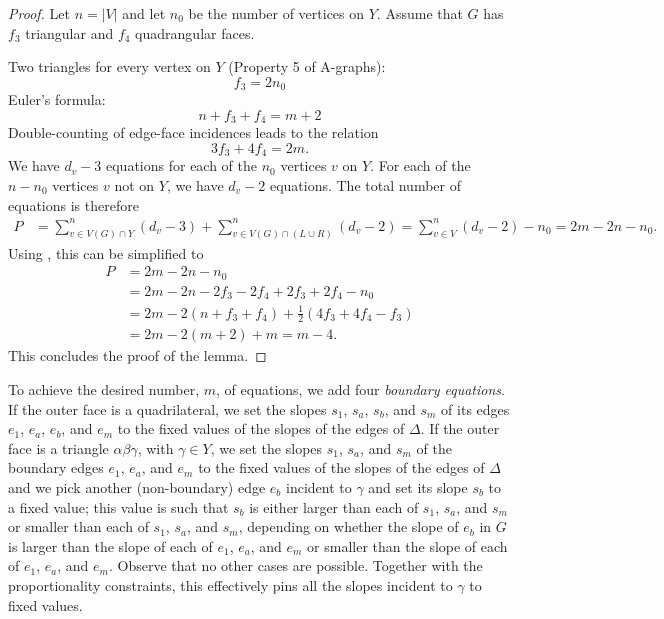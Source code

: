 \begin{proof}
Let $n=|V|$ and let $n_0$ be the number
of vertices on $Y$. Assume that $G$ has $f_3$ triangular and $f_4$
quadrangular faces.

Two triangles for every vertex on $Y$ (Property 5 of A-graphs):
\begin{equation}
\label{eq:f3}
f_3 = 2n_0
\end{equation}
Euler's formula:
\begin{equation}
\label{eq:Euler}
n + f_3+f_4 = m+2
\end{equation}
Double-counting of edge-face incidences leads to the relation
\begin{equation}
\label{eq:edge-face}
3f_3+4f_4=2m.
\end{equation}
We have $d_v-3$ equations for each of the $n_0$ vertices $v$ on $Y$. For each of the 
$n-n_0$ vertices $v$ not on $Y$, 
we have $d_v-2$ equations.
The total number of equations is therefore
\begin{align*}
P &= 
\sum_{v\in V(G)\cap Y}^n(d_v-3)+
\sum_{v\in V(G)\cap(L\cup R)}^n(d_v-2)
=
\sum_{v\in V}^n(d_v-2)-n_0
=
2m-2n-n_0.
\end{align*}
Using \thetag{\ref{eq:f3}--\ref{eq:edge-face}}, this can be
simplified to
\begin{align*}
P&=
2m-2n-n_0\\
&= 2m -2n -2f_3-2f_4 +2f_3+2f_4-n_0\\
&= 2m -2(n +f_3+f_4) +\tfrac12(4f_3+4f_4-f_3)\\
&= 2m -2(m+2) +m = m-4.
\end{align*}
This concludes the proof of the lemma.
\end{proof}

To achieve the desired number, $m$, of equations, we add
four \emph{boundary equations}.  If the outer face is a quadrilateral, we set
the slopes $s_1$, $s_a$, $s_b$, and $s_m$ of its edges $e_1$, $e_a$, $e_b$, and $e_m$ to the fixed values of the slopes of the edges of $\Delta$. If the outer face is a triangle $\alpha\beta\gamma$, with $\gamma\in Y$, we set the slopes $s_1$, $s_a$, and $s_m$ of the boundary edges $e_1$, $e_a$, and $e_m$ to the fixed values of the slopes of the edges of $\Delta$ and we pick another (non-boundary) edge $e_b$ incident to $\gamma$ and set its slope $s_b$ to a fixed value; this value is such that $s_b$ is either larger than each of $s_1$, $s_a$, and $s_m$ or smaller than each of $s_1$, $s_a$, and $s_m$, depending on whether the slope of $e_b$ in $G$ is larger than the slope of each of $e_1$, $e_a$, and $e_m$ or smaller than the slope of each of $e_1$, $e_a$, and $e_m$. Observe that no other cases are possible. Together with the proportionality constraints, this effectively pins all the slopes incident to $\gamma$ to fixed values.

